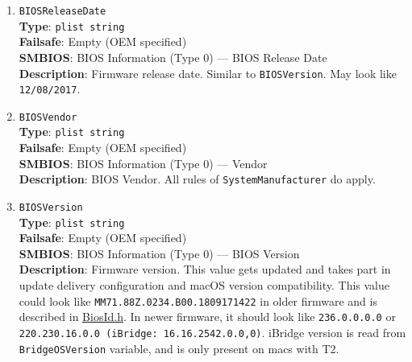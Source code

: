 \documentclass[]{article}
\begin{document}
\begin{enumerate}

\item
  \texttt{BIOSReleaseDate}\\
  \textbf{Type}: \texttt{plist\ string}\\
  \textbf{Failsafe}: Empty (OEM specified)\\
  \textbf{SMBIOS}: BIOS Information (Type 0) --- BIOS Release Date\\
  \textbf{Description}: Firmware release date. Similar to
  \texttt{BIOSVersion}. May look like \texttt{12/08/2017}.
\item
  \texttt{BIOSVendor}\\
  \textbf{Type}: \texttt{plist\ string}\\
  \textbf{Failsafe}: Empty (OEM specified)\\
  \textbf{SMBIOS}: BIOS Information (Type 0) --- Vendor\\
  \textbf{Description}: BIOS Vendor. All rules of
  \texttt{SystemManufacturer} do apply.
\item
  \texttt{BIOSVersion}\\
  \textbf{Type}: \texttt{plist\ string}\\
  \textbf{Failsafe}: Empty (OEM specified)\\
  \textbf{SMBIOS}: BIOS Information (Type 0) --- BIOS Version\\
  \textbf{Description}: Firmware version. This value gets updated and
  takes part in update delivery configuration and macOS version
  compatibility. This value could look like
  \texttt{MM71.88Z.0234.B00.1809171422} in older firmware and is
  described in
  \href{https://github.com/acidanthera/MaxRegnerPkg/blob/master/Include/Apple/Guid/BiosId.h}{BiosId.h}.
  In newer firmware, it should look like \texttt{236.0.0.0.0} or
  \texttt{220.230.16.0.0\ (iBridge:\ 16.16.2542.0.0,0)}. iBridge version
  is read from \texttt{BridgeOSVersion} variable, and is only present on
  macs with T2.


\end{enumerate}
\end{document}
